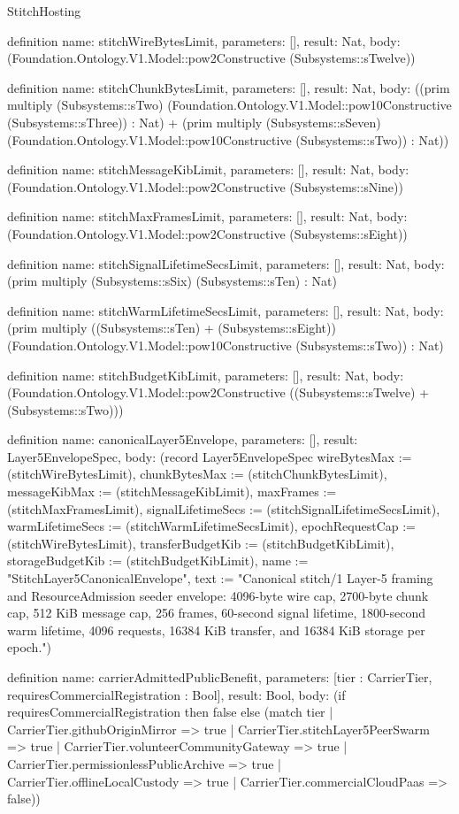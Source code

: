 \begin{lexlean}{StitchHosting}
\begin{semanticmodule}
definition{
  name: stitchWireBytesLimit,
  parameters: [],
  result: Nat,
  body: (Foundation.Ontology.V1.Model::pow2Constructive (Subsystems::sTwelve))
}

definition{
  name: stitchChunkBytesLimit,
  parameters: [],
  result: Nat,
  body: ((prim multiply (Subsystems::sTwo) (Foundation.Ontology.V1.Model::pow10Constructive (Subsystems::sThree)) : Nat) + (prim multiply (Subsystems::sSeven) (Foundation.Ontology.V1.Model::pow10Constructive (Subsystems::sTwo)) : Nat))
}

definition{
  name: stitchMessageKibLimit,
  parameters: [],
  result: Nat,
  body: (Foundation.Ontology.V1.Model::pow2Constructive (Subsystems::sNine))
}

definition{
  name: stitchMaxFramesLimit,
  parameters: [],
  result: Nat,
  body: (Foundation.Ontology.V1.Model::pow2Constructive (Subsystems::sEight))
}

definition{
  name: stitchSignalLifetimeSecsLimit,
  parameters: [],
  result: Nat,
  body: (prim multiply (Subsystems::sSix) (Subsystems::sTen) : Nat)
}

definition{
  name: stitchWarmLifetimeSecsLimit,
  parameters: [],
  result: Nat,
  body: (prim multiply ((Subsystems::sTen) + (Subsystems::sEight)) (Foundation.Ontology.V1.Model::pow10Constructive (Subsystems::sTwo)) : Nat)
}

definition{
  name: stitchBudgetKibLimit,
  parameters: [],
  result: Nat,
  body: (Foundation.Ontology.V1.Model::pow2Constructive ((Subsystems::sTwelve) + (Subsystems::sTwo)))
}

definition{
  name: canonicalLayer5Envelope,
  parameters: [],
  result: Layer5EnvelopeSpec,
  body: (record Layer5EnvelopeSpec {wireBytesMax := (stitchWireBytesLimit), chunkBytesMax := (stitchChunkBytesLimit), messageKibMax := (stitchMessageKibLimit), maxFrames := (stitchMaxFramesLimit), signalLifetimeSecs := (stitchSignalLifetimeSecsLimit), warmLifetimeSecs := (stitchWarmLifetimeSecsLimit), epochRequestCap := (stitchWireBytesLimit), transferBudgetKib := (stitchBudgetKibLimit), storageBudgetKib := (stitchBudgetKibLimit), name := "StitchLayer5CanonicalEnvelope", text := "Canonical stitch/1 Layer-5 framing and ResourceAdmission seeder envelope: 4096-byte wire cap, 2700-byte chunk cap, 512 KiB message cap, 256 frames, 60-second signal lifetime, 1800-second warm lifetime, 4096 requests, 16384 KiB transfer, and 16384 KiB storage per epoch."})
}

definition{
  name: carrierAdmittedPublicBenefit,
  parameters: [tier : CarrierTier, requiresCommercialRegistration : Bool],
  result: Bool,
  body: (if requiresCommercialRegistration then false else (match tier
    | CarrierTier.githubOriginMirror => true
    | CarrierTier.stitchLayer5PeerSwarm => true
    | CarrierTier.volunteerCommunityGateway => true
    | CarrierTier.permissionlessPublicArchive => true
    | CarrierTier.offlineLocalCustody => true
    | CarrierTier.commercialCloudPaas => false))
}


\end{semanticmodule}
\end{lexlean}

